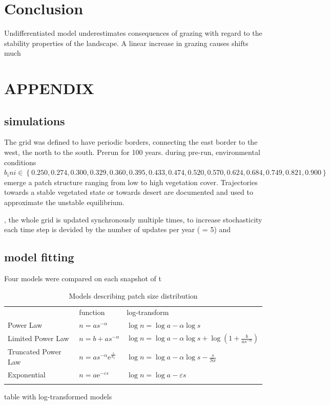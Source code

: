 \section{Conclusion}
Undifferentiated model underestimates consequences of grazing with regard to the stability properties of the landscape. 
A linear increase in grazing causes shifts much  

\section{APPENDIX}

\subsection{simulations}

The grid was defined to have periodic borders, connecting the east border to the west, the north to the south.
Prerun for 100 years. 
during pre-run, environmental conditions $b_ini \in \left\{ 0.250, 0.274, 0.300, 0.329, 0.360, 0.395, 0.433, 0.474, 0.520, 0.570, 0.624, 0.684, 0.749, 0.821, 0.900 \right\} $ emerge a patch structure ranging from low to high vegetation cover. Trajectories towards a stable vegetated state or towards desert are documented and used to approximate the unstable equilibrium.

, the whole grid is updated synchronously multiple times, to increase stochasticity
each time step is devided by the number of updates per year ( = 5) and

\subsection{model fitting}
 Four models were compared on each snapshot of t


\begin{table}[t!]
\label{tab:fitmodels}
\caption{ Models describing patch size distribution }
\centering
\begin{tabular}{lll}

\toprule
 & function & log-transform \\ \cmidrule(rl){2-2} \cmidrule(rl){3-3}
Power Law &  $n = a s^{- \alpha}$ & $ \log{n} =\log{a} - \alpha \log s$\\
Limited Power Law &  $n = b + a s^{- \alpha} $ & $ \log{n} = \log a - \alpha \log{s} + \log(1+\frac{b}{a s^{-\alpha} })$\\
Truncated Power Law & $n = a s^{- \alpha} \mathrm{e}^{\frac{s}{S_x}}$  & $\log{n} = \log a  - \alpha  \log s  - \frac{s}{Sx}  $ \\
Exponential &  $n = a \mathrm{e}^{-\varepsilon s} $ & $ \log{n} =  \log{a} - \varepsilon s $\\
	\bottomrule
\multicolumn{3}{p{12.5cm}}{\footnotesize  }
	\end{tabular}
\end{table}


table with log-transformed models


